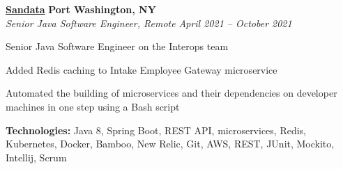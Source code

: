 %
    \headerrow
        {\textbf{\href{https://www.sandata.com/}{Sandata}}}
        {\textbf{Port Washington, NY}}
    \\
    \headerrow
        {\emph{Senior Java Software Engineer, Remote}}
        {\emph{April 2021 -- October 2021}}
    \begin{itemize*}
        \item Senior Java Software Engineer on the Interops team
        \item Added Redis caching to Intake Employee Gateway microservice
        \item Automated the building of microservices and their dependencies on developer machines in one step using a Bash script
    \end{itemize*}

    \hspace{1.0em}
        {\textbf{Technologies:} Java 8, Spring Boot, REST API, microservices, Redis, Kubernetes, Docker, Bamboo, New Relic,
        Git, AWS, REST, JUnit, Mockito, Intellij, Scrum}

